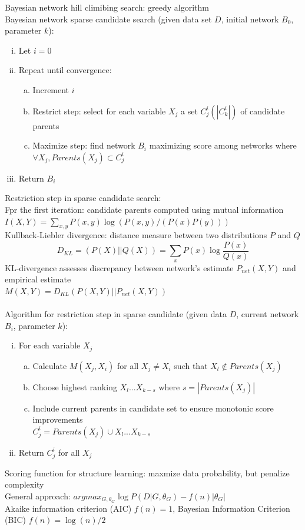 \documentclass{article}
\begin{document}
			Bayesian network hill climibing search: greedy algorithm \\
			Bayesian network sparse candidate search (given data set $D$, initial network $B_0$, parameter $k$):
			\begin{enumerate}[(i)]
				\item Let $i = 0$
				\item Repeat until convergence:
				\begin{enumerate}[(a)]
					\item Increment $i$
					\item Restrict step: select for each variable $X_j$ a set $C_j^i(|C_k^i|)$ of candidate parents
					\item Maximize step: find network $B_i$ maximizing score among networks where $\forall X_j, Parents(X_j) \subset C_j^i$
					\end{enumerate}
				\item Return $B_i$
				\end{enumerate}
			Restriction step in sparse candidate search: \\
			Fpr the first iteration: candidate parents computed using mutual information \\
			$I(X, Y) = \sum_{x, y} P(x, y)\log{(P(x, y)/(P(x)P(y)))}$ \\
			Kullback-Liebler divergence: distance measure between two distributions $P$ and $Q$
			\begin{equation*}
				D_{KL} = (P(X)||Q(X)) = \sum\limits_x P(x)\log\frac{P(x)}{Q(x)}
				\end{equation*}
			KL-divergence assesses discrepancy between network's estimate $P_{net}(X, Y)$ and empirical estimate \\
			$M(X, Y) = D_{KL}(P(X, Y)||P_{net}(X, Y))$ \\
			\\
			Algorithm for restriction step in sparse candidate (given data $D$, current network $B_i$, parameter $k$):
			\begin{enumerate}[(i)]
				\item For each variable $X_j$
				\begin{enumerate}[(a)]
					\item Calculate $M(X_j, X_i)$ for all $X_j \neq X_i$ such that $X_l \notin Parents(X_j)$
					\item Choose highest ranking $X_l...X_{k - s}$ where $s = |Parents(X_j)|$
					\item Include current parents in candidate set to ensure monotonic score improvements \\
					$C_j^i = Parents(X_j) \cup X_l ... X_{k - s}$
					\end{enumerate}
				\item Return ${C_j^i}$ for all $X_j$
				\end{enumerate}
			Scoring function for structure learning: maxmize data probability, but penalize complexity \\
			General approach: $argmax_{G, \theta_G} \log{P(D|G, \theta_G)} - f(n)|\theta_G|$ \\
			Akaike information criterion (AIC) $f(n) = 1$, Bayesian Information Criterion (BIC) $f(n) = \log{(n)}/2$
\end{document}
